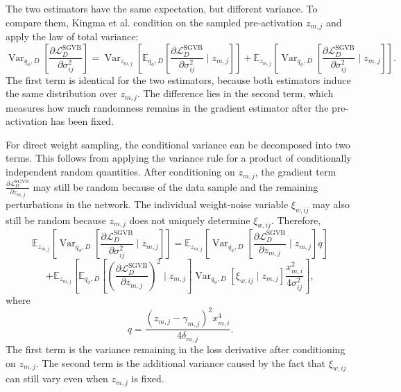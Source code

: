 The two estimators have the same expectation, but different variance. To compare them, Kingma et al. condition on the sampled pre-activation \(z_{m,j}\) and apply the law of total variance:
\begin{equation}
\operatorname{Var}_{q_{\phi},D}
\left[
\frac{\partial \mathcal{L}_{D}^{\mathrm{SGVB}}}{\partial \sigma_{ij}^{2}}
\right]
=
\operatorname{Var}_{z_{m,j}}
\left[
\mathbb{E}_{q_{\phi},D}
\left[
\frac{\partial \mathcal{L}_{D}^{\mathrm{SGVB}}}{\partial \sigma_{ij}^{2}}
\mid z_{m,j}
\right]
\right]
+
\mathbb{E}_{z_{m,j}}
\left[
\operatorname{Var}_{q_{\phi},D}
\left[
\frac{\partial \mathcal{L}_{D}^{\mathrm{SGVB}}}{\partial \sigma_{ij}^{2}}
\mid z_{m,j}
\right]
\right].
\end{equation}
The first term is identical for the two estimators, because both estimators induce the same distribution over \(z_{m,j}\). The difference lies in the second term, which measures how much randomness remains in the gradient estimator after the pre-activation has been fixed.

For direct weight sampling, the conditional variance can be decomposed into two terms. This follows from applying the variance rule for a product of conditionally independent random quantities. After conditioning on \(z_{m,j}\), the gradient term \(\frac{\partial \mathcal{L}^{\mathrm{SGVB}}_D}{\partial z_{m,j}}\) may still be random because of the data sample and the remaining perturbations in the network. The individual weight-noise variable \(\xi_{w,ij}\) may also still be random because \(z_{m,j}\) does not uniquely determine \(\xi_{w,ij}\). Therefore,
\[
\mathbb{E}_{z_{m,j}}
\left[
\operatorname{Var}_{q_\phi,D}
\left[
\frac{\partial \mathcal{L}^{\mathrm{SGVB}}_D}
{\partial \sigma_{ij}^2}
\mid z_{m,j}
\right]
\right]
=
\mathbb{E}_{z_{m,j}}
\left[
\operatorname{Var}_{q_\phi,D}
\left[
\frac{\partial \mathcal{L}^{\mathrm{SGVB}}_D}
{\partial z_{m,j}}
\mid z_{m,j}
\right]
q
\right]
\]
\[
+
\mathbb{E}_{z_{m,j}}
\left[
\mathbb{E}_{q_\phi,D}
\left[
\left(
\frac{\partial \mathcal{L}^{\mathrm{SGVB}}_D}
{\partial z_{m,j}}
\right)^2
\mid z_{m,j}
\right]
\operatorname{Var}_{q_\phi,D}
\left[
\xi_{w,ij}
\mid z_{m,j}
\right]
\frac{x_{m,i}^2}{4\sigma_{ij}^2}
\right],
\]
where
\[
q
=
\frac{(z_{m,j}-\gamma_{m,j})^2 x_{m,i}^4}
{4\delta_{m,j}}.
\]
The first term is the variance remaining in the loss derivative after conditioning on \(z_{m,j}\). The second term is the additional variance caused by the fact that \(\xi_{w,ij}\) can still vary even when \(z_{m,j}\) is fixed.

